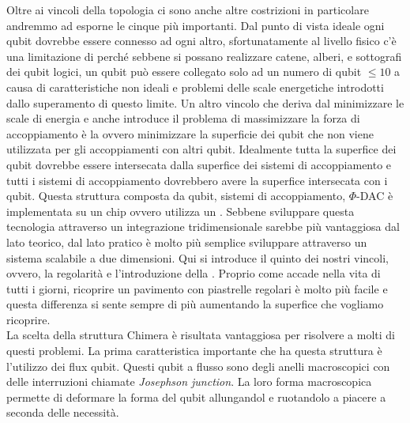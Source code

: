 Oltre ai vincoli della topologia ci sono anche altre costrizioni in particolare andremmo ad esporne le cinque più importanti. Dal punto di vista ideale ogni qubit dovrebbe essere connesso ad ogni altro, sfortunatamente al livello fisico c'è una limitazione di  perché sebbene si possano realizzare catene, alberi, e sottografi dei qubit logici, un qubit può essere collegato solo ad un numero di qubit $\le 10$ a causa di caratteristiche non ideali e problemi delle scale energetiche introdotti dallo superamento di questo limite. Un altro vincolo che deriva dal minimizzare le scale di energia e anche introduce il problema di massimizzare la forza di accoppiamento è la  ovvero minimizzare la superficie dei qubit che non viene utilizzata per gli accoppiamenti con altri qubit. Idealmente tutta la superfice dei qubit dovrebbe essere intersecata dalla superfice dei sistemi di accoppiamento e tutti i sistemi di accoppiamento dovrebbero avere la superfice intersecata con i qubit. Questa struttura composta da qubit, sistemi di accoppiamento, $\Phi$-DAC è implementata su un chip ovvero utilizza un . Sebbene sviluppare questa tecnologia attraverso un integrazione tridimensionale sarebbe più vantaggiosa dal lato teorico, dal lato pratico è molto più semplice sviluppare attraverso un sistema scalabile a due dimensioni. Qui si introduce il quinto dei nostri vincoli, ovvero, la regolarità e l'introduzione della . Proprio come accade nella vita di tutti i giorni, ricoprire un pavimento con piastrelle regolari è molto più facile e questa differenza si sente sempre di più aumentando la superfice che vogliamo ricoprire.\\
La scelta della struttura Chimera è risultata vantaggiosa per risolvere a molti di questi problemi. La prima caratteristica importante che ha questa struttura è l'utilizzo dei flux qubit. Questi qubit a flusso sono degli anelli macroscopici con delle interruzioni chiamate \textit{Josephson junction}. La loro forma macroscopica permette di deformare la forma del qubit allungandol e ruotandolo a piacere a seconda delle necessità.
